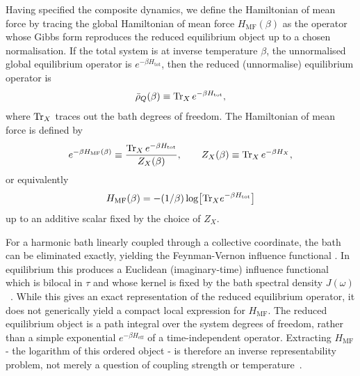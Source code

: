 Having specified the composite dynamics, we define the Hamiltonian of mean force by tracing the global Hamiltonian of mean force $H_{\mathrm{MF}}(\beta)$ as the operator whose Gibbs
form reproduces the reduced equilibrium object up to a chosen normalisation. If
the total system is at inverse temperature $\beta$, the unnormalised global
equilibrium operator is $e^{-\beta H_{\mathrm{tot}}}$, then the reduced
(unnormalise) equilibrium operator is
\begin{equation}
    \bar{\rho}_Q(\beta)\equiv \mathrm{Tr}_X\, e^{-\beta H_{\mathrm{tot}}},
    \label{eq:reduced_equilibrium_operator}
\end{equation}
where $\mathrm{Tr}_X$ traces out the bath degrees of freedom. The Hamiltonian of mean
force is defined by
\begin{equation}
    e^{-\beta H_{\mathrm{MF}}(\beta)}
    \equiv
    \frac{\mathrm{Tr}_X\, e^{-\beta H_{\mathrm{tot}}}}{Z_X(\beta)},
    \qquad
    Z_X(\beta)\equiv \mathrm{Tr}_X\, e^{-\beta H_X},
    \label{eq:HMF_def}
\end{equation}
or equivalently
\begin{equation}
H_{\mathrm{MF}}(\beta)=-(1/\beta)\log\!\big[\mathrm{Tr}_X e^{-\beta H_{\mathrm{tot}}}\big]
\end{equation}
up to an additive scalar fixed by the choice of $Z_X$.

For a harmonic bath linearly coupled through a collective coordinate, the bath
can be eliminated exactly, yielding the Feynman-Vernon influence functional
\cite{feynmanTheoryGeneralQuantum1963a, grabertQuantumBrownianMotion1988, ingoldSpecificHeatAnomalies2009, hanggiFiniteQuantumDissipation2008}.
In equilibrium this produces a Euclidean (imaginary-time) influence functional
which is bilocal in $\tau$ and whose kernel is fixed by the bath spectral
density $J(\omega)$~\cite{moixEquilibriumreducedDensityMatrix2012, mccaulPartitionfreeApproachOpen2017c, mccaulDrivingSpinbosonModels2018a, mccaulHowWinFriends2021b}. While this gives an exact representation of the reduced equilibrium operator, it does not generically yield a compact local expression for $H_{\mathrm{MF}}$. The reduced equilibrium object is a path integral over the system degrees of freedom, rather than a
simple exponential $e^{-\beta H_{\mathrm{eff}}}$ of a time-independent operator.
Extracting $H_{\mathrm{MF}}$ - the logarithm of this ordered object - is
therefore an inverse representability problem, not merely a question of coupling
strength or temperature~\cite{talknerColloquiumStatisticalMechanics2020, hovhannisyanHamiltonianMeanForce2020}.

